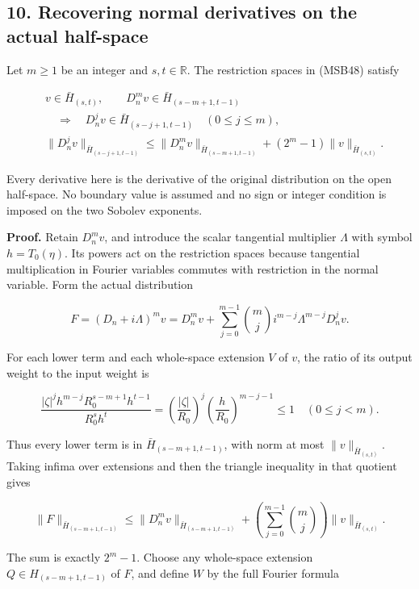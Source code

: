 \documentclass[
  11pt,
]{article}
\begin{document}
\subsection{10. Recovering normal derivatives on the actual
half-space}\label{recovering-normal-derivatives-on-the-actual-half-space}

Let \(m\geq1\) be an integer and \(s,t\in\mathbb R\). The restriction
spaces in (MSB48) satisfy

\[
 \begin{aligned}
 &v\in\bar H_{(s,t)},\qquad
       D_n^mv\in\bar H_{(s-m+1,t-1)}\\
 &\quad\Longrightarrow\quad
 D_n^jv\in\bar H_{(s-j+1,t-1)}\quad(0\leq j\leq m),\\
 &\|D_n^jv\|_{\bar H_{(s-j+1,t-1)}}
 \leq \|D_n^mv\|_{\bar H_{(s-m+1,t-1)}}
              +(2^m-1)\|v\|_{\bar H_{(s,t)}} .
 \end{aligned}
 \tag{MSB50}
\]

Every derivative here is the derivative of the original distribution on
the open half-space. No boundary value is assumed and no sign or integer
condition is imposed on the two Sobolev exponents.

\textbf{Proof.} Retain \(D_n^mv\), and introduce the scalar tangential
multiplier \(\Lambda\) with symbol \(h=T_0(\eta)\). Its powers act on
the restriction spaces because tangential multiplication in Fourier
variables commutes with restriction in the normal variable. Form the
actual distribution

\[
 F=(D_n+i\Lambda)^mv
   =D_n^mv+\sum_{j=0}^{m-1}\binom mj i^{m-j}
                    \Lambda^{m-j}D_n^jv .
 \tag{MSB51}
\]

For each lower term and each whole-space extension \(V\) of \(v\), the
ratio of its output weight to the input weight is

\[
 \frac{|\zeta|^j h^{m-j}R_0^{s-m+1}h^{t-1}}{R_0^sh^t}
   =\left(\frac{|\zeta|}{R_0}\right)^j
      \left(\frac h{R_0}\right)^{m-j-1}\leq1
       \quad(0\leq j<m).
 \tag{MSB52}
\]

Thus every lower term is in \(\bar H_{(s-m+1,t-1)}\), with norm at most
\(\|v\|_{\bar H_{(s,t)}}\). Taking infima over extensions and then the
triangle inequality in that quotient gives

\[
 \|F\|_{\bar H_{(s-m+1,t-1)}}
 \leq \|D_n^mv\|_{\bar H_{(s-m+1,t-1)}}
       +\left(\sum_{j=0}^{m-1}\binom mj\right)
                 \|v\|_{\bar H_{(s,t)}}.
 \tag{MSB53}
\]

The sum is exactly \(2^m-1\). Choose any whole-space extension
\(Q\in H_{(s-m+1,t-1)}\) of \(F\), and define \(W\) by the full Fourier
formula
\end{document}
